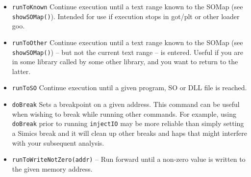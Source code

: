\documentclass[titlepage]{article}
\begin{document}
\begin{itemize}
\item {\tt runToKnown} Continue execution until a text range known to the SOMap (see {\tt showSOMap()}).  Intended for use if execution stops in got/plt 
or other loader goo.

\item {\tt runToOther} Continue execution until a text range known to the SOMap (see {\tt showSOMap()}) -- but not the current text range -- is entered.
Useful if you are in some library called by some other library, and you want to return to the latter.

\item {\tt runToSO} Continue execution until a given program, SO or DLL file is reached.

\item {\tt doBreak} Sets a breakpoint on a given address.  This command can be useful when wishing to break while running other commands.  For example,
using {\tt doBreak} prior to running {\tt injectIO} may be more reliable than simply setting a Simics break and it will clean up other breaks and haps that 
might interfere with your subsequent analysis.

\item {\tt runToWriteNotZero(addr)} – Run forward until a non-zero value is written to the given memory address.


\end{itemize}
\end{document}

